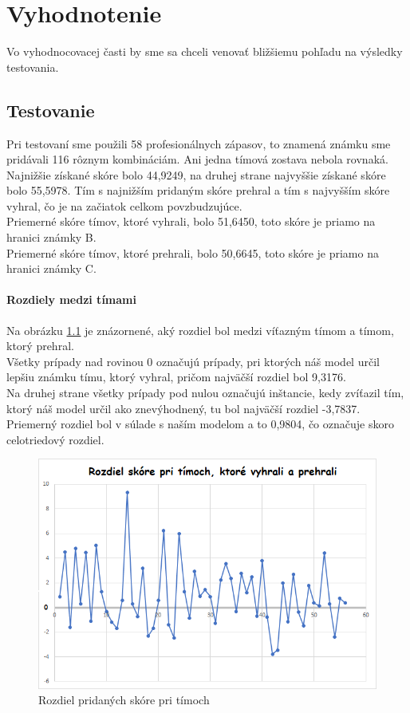 
\chapter{Vyhodnotenie}
\label{evaluation}
Vo vyhodnocovacej časti by sme sa chceli venovať bližšiemu pohľadu na výsledky testovania.

\section{Testovanie}
Pri testovaní sme použili 58 profesionálnych zápasov, to znamená známku sme pridávali 116 rôznym kombináciám. Ani jedna tímová zostava nebola rovnaká. Najnižšie získané skóre bolo 44,9249, na druhej strane najvyššie získané skóre bolo 55,5978. Tím s najnižším pridaným skóre prehral a tím s najvyšším skóre vyhral, čo je na začiatok celkom povzbudzujúce. 
\\Priemerné skóre tímov, ktoré vyhrali, bolo 51,6450, toto skóre je priamo na hranici známky B. 
\\Priemerné skóre tímov, ktoré prehrali, bolo 50,6645, toto skóre je priamo na hranici známky C.
\subsubsection{Rozdiely medzi tímami}
Na obrázku \ref{rozdiel} je znázornené, aký rozdiel bol medzi víťazným tímom a tímom, ktorý prehral. \\Všetky prípady nad rovinou 0 označujú prípady, pri ktorých náš model určil lepšiu známku tímu, ktorý vyhral, pričom najväčší rozdiel bol 9,3176.
\\ Na druhej strane všetky prípady pod nulou označujú inštancie, kedy zvíťazil tím, ktorý náš model určil ako znevýhodnený, tu bol najväčší rozdiel -3,7837.
\\ Priemerný rozdiel bol v súlade s naším modelom a to 0,9804, čo označuje skoro celotriedový rozdiel.
\begin{figure}[h!]
	
	\includegraphics[width=.9\textwidth]{figures/rozdiel}
	\centering
	\caption{ Rozdiel pridaných skóre pri tímoch \label{rozdiel}}
	
\end{figure}

